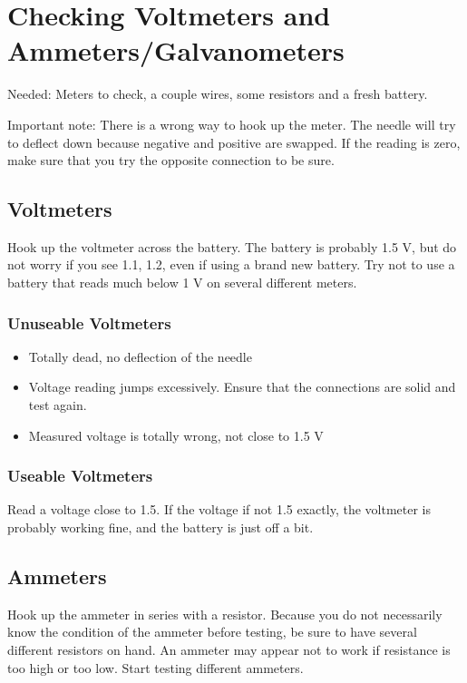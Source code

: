 \chapter{Checking Voltmeters and Ammeters/Galvanometers}
\label{cha:voltamm}
Needed: Meters to check, 
a couple wires, 
some resistors and a fresh battery.

Important note: There is a wrong way to hook up the meter. 
The needle will try to deflect down 
because negative and positive are swapped. 
If the reading is zero, 
make sure that you try the opposite connection to be sure.

\section{Voltmeters}
Hook up the voltmeter across the battery. 
The battery is probably 1.5 V, 
but do not worry if you see 1.1, 
1.2, 
even if using a brand new battery. 
Try not to use a battery that reads much below 1 V 
on several different meters.

\subsection{Unuseable Voltmeters}
\begin{itemize}
\item{Totally dead, no deflection of the needle}
\item{Voltage reading jumps excessively. 
Ensure that the connections are solid and test again.}
\item{Measured voltage is totally wrong, not close to 1.5 V}
\end{itemize}

\subsection{Useable Voltmeters}
Read a voltage close to 1.5. 
If the voltage if not 1.5 exactly, 
the voltmeter is probably working fine, 
and the battery is just off a bit.

\section{Ammeters}
Hook up the ammeter in series with a resistor. 
Because you do not necessarily know the condition of the ammeter before testing, 
be sure to have several different resistors on hand. 
An ammeter may appear not to work if resistance is too high or too low. 
Start testing different ammeters.

